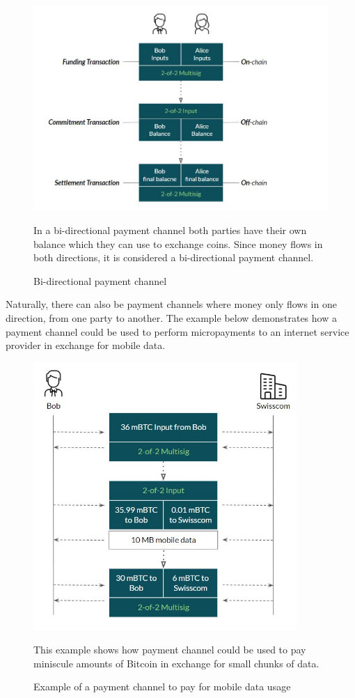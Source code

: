 \documentclass[a4paper, 12pt]{report}
\begin{document}
\begin{figure}[H]
	\centering
	\includegraphics[width=13cm]{04_Bidirectional_Channel}
	\caption{Bi-directional payment channel}
	\medskip
	\small In a bi-directional payment channel both parties have their own balance which they can use to exchange coins. Since money flows in both directions, it is considered a bi-directional payment channel.
	\label{fig:04_Bidirectional_Channel}
\end{figure}

\par Naturally, there can also be payment channels where money only flows in one direction, from one party to another. The example below demonstrates how a payment channel could be used to perform micropayments to an internet service provider in exchange for mobile data.

\begin{figure}[H]
	\centering
	\includegraphics[width=10cm]{05_Onedirectional_Channel}
	\caption{Example of a payment channel to pay for mobile data usage}
	\medskip
	\small This example shows how payment channel could be used to pay miniscule amounts of Bitcoin in exchange for small chunks of data.
	\label{fig:05_Onedirectional_Channel}
\end{figure}
\end{document}
